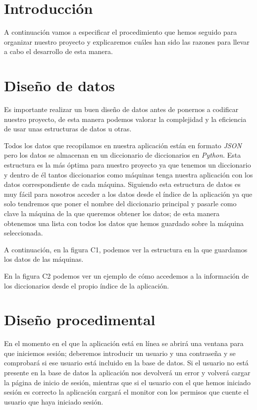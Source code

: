 
\section{Introducción}

A continuación vamos a especificar el procedimiento que hemos seguido para organizar nuestro proyecto y explicaremos cuáles han sido las razones para llevar a cabo el desarrollo de esta manera. 

\section{Diseño de datos}

Es importante realizar un buen diseño de datos antes de ponernos a codificar nuestro proyecto, de esta manera podemos valorar la complejidad y la eficiencia de usar unas estructuras de datos u otras.

Todos los datos que recopilamos en nuestra aplicación están en formato \textit{JSON} pero los datos se almacenan en un diccionario de diccionarios en \textit{Python}. Esta estructura es la más óptima para nuestro proyecto ya que tenemos un diccionario y dentro de él tantos diccionarios como máquinas tenga nuestra aplicación con los datos correspondiente de cada máquina. Siguiendo esta estructura de datos es muy fácil para nosotros acceder a los datos desde el índice de la aplicación ya que solo tendremos que poner el nombre del diccionario principal y pasarle como clave la máquina de la que queremos obtener los datos; de esta manera obtenemos una lista con todos los datos que hemos guardado sobre la máquina seleccionada.

A continuación, en la figura C1, podemos ver la estructura en la que guardamos los datos de las máquinas.

En la figura C2 podemos ver un ejemplo de cómo accedemos a la información de los diccionarios desde el propio índice de la aplicación.


\section{Diseño procedimental}
En el momento en el que la aplicación está en línea se abrirá una ventana para que iniciemos sesión; deberemos introducir un usuario y una contraseña y se comprobará si ese usuario está incluido en la base de datos. Si el usuario no está presente en la base de datos la aplicación nos devolverá un error y volverá cargar la página de inicio de sesión, mientras que si el usuario con el que hemos iniciado sesión es correcto la aplicación cargará el monitor con los permisos que cuente el usuario que haya iniciado sesión.

